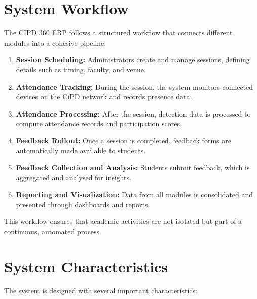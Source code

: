 \section{System Workflow}

The CIPD 360 ERP follows a structured workflow that connects different modules into a cohesive
pipeline:

\begin{enumerate}
    \item \textbf{Session Scheduling:}
    Administrators create and manage sessions, defining details such as timing, faculty, and
    venue.

    \item \textbf{Attendance Tracking:}
    During the session, the system monitors connected devices on the CiPD network and records
    presence data.

    \item \textbf{Attendance Processing:}
    After the session, detection data is processed to compute attendance records and
    participation scores.

    \item \textbf{Feedback Rollout:}
    Once a session is completed, feedback forms are automatically made available to students.

    \item \textbf{Feedback Collection and Analysis:}
    Students submit feedback, which is aggregated and analysed for insights.

    \item \textbf{Reporting and Visualization:}
    Data from all modules is consolidated and presented through dashboards and reports.
\end{enumerate}

This workflow ensures that academic activities are not isolated but part of a continuous, automated
process.



\section{System Characteristics}

The system is designed with several important characteristics:

